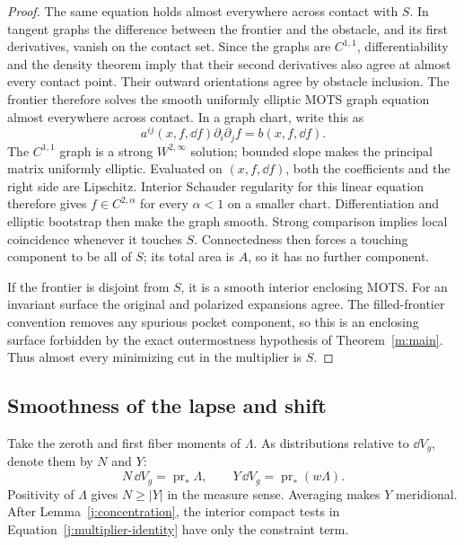 \begin{proof}
The same equation holds almost everywhere across contact with \(S\).
In tangent graphs the difference between the frontier and the obstacle,
and its first derivatives, vanish on the contact set. Since the graphs
are \(C^{1,1}\), differentiability and the density theorem imply that
their second derivatives also agree at almost every contact point.
Their outward orientations agree by obstacle inclusion. The frontier
therefore solves the smooth uniformly elliptic MOTS graph equation
almost everywhere across contact. In a graph chart, write this as
\[
 a^{ij}(x,f,\dd f)\partial_i\partial_jf
                   =b(x,f,\dd f).
\]
The \(C^{1,1}\) graph is a strong \(W^{2,\infty}\) solution; bounded
slope makes the principal matrix uniformly elliptic. Evaluated on
\((x,f,\dd f)\), both the coefficients and the right side are Lipschitz.
Interior Schauder regularity for this linear equation therefore gives
\(f\in C^{2,\alpha}\) for every \(\alpha<1\) on a smaller chart.
Differentiation and elliptic bootstrap then make the graph smooth.
Strong comparison implies local coincidence whenever
it touches \(S\). Connectedness then forces a touching component to be
all of \(S\); its total area is \(A\), so it has no further component.

If the frontier is disjoint from \(S\), it is a smooth interior enclosing
MOTS. For an invariant surface the original and polarized expansions
agree. The filled-frontier convention removes any spurious pocket
component, so this is an enclosing surface forbidden by the exact
outermostness hypothesis of Theorem~\ref{m:main}. Thus almost every
minimizing cut in the multiplier is \(S\).
\end{proof}

\subsection{Smoothness of the lapse and shift}

Take the zeroth and first fiber moments of \(\Lambda\). As distributions
relative to \(\dd V_g\), denote them by \(N\) and \(Y\):
\[
 N\,\dd V_g=\operatorname{pr}_*\Lambda,\qquad
 Y\,\dd V_g=\operatorname{pr}_*(w\Lambda).
\]
Positivity of \(\Lambda\) gives \(N\geq |Y|\) in the measure sense.
Averaging makes \(Y\) meridional. After
Lemma~\ref{j:concentration}, the interior compact tests in
Equation~\eqref{j:multiplier-identity} have only the constraint term.

